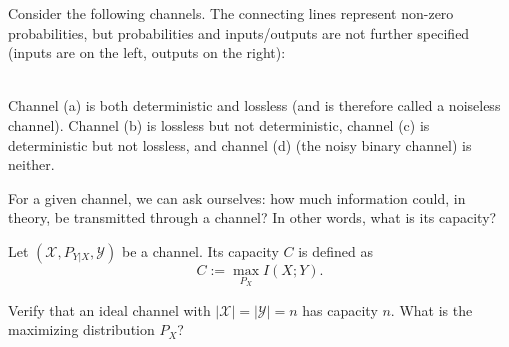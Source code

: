 \begin{example}
Consider the following channels. The connecting lines represent non-zero probabilities, but probabilities and inputs/outputs are not further specified (inputs are on the left, outputs on the right):\\
\\Channel (a) is both deterministic and lossless (and is therefore called a noiseless channel). Channel (b) is lossless but not deterministic, channel (c) is deterministic but not lossless, and channel (d) (the noisy binary channel) is neither.
\end{example}

For a given channel, we can ask ourselves: how much information could, in theory, be transmitted through a channel? In other words, what is its capacity?

\begin{definition}
Let $(\mathcal{X}, P_{Y|X}, \mathcal{Y})$ be a channel. Its capacity $C$ is defined as
\[
C := \max_{P_X} I(X;Y).
\]
\end{definition}

\begin{exercise}
Verify that an ideal channel with $|\mathcal{X}| = |\mathcal{Y}| = n$ has capacity $n$. What is the maximizing distribution $P_X$?
\end{exercise}


